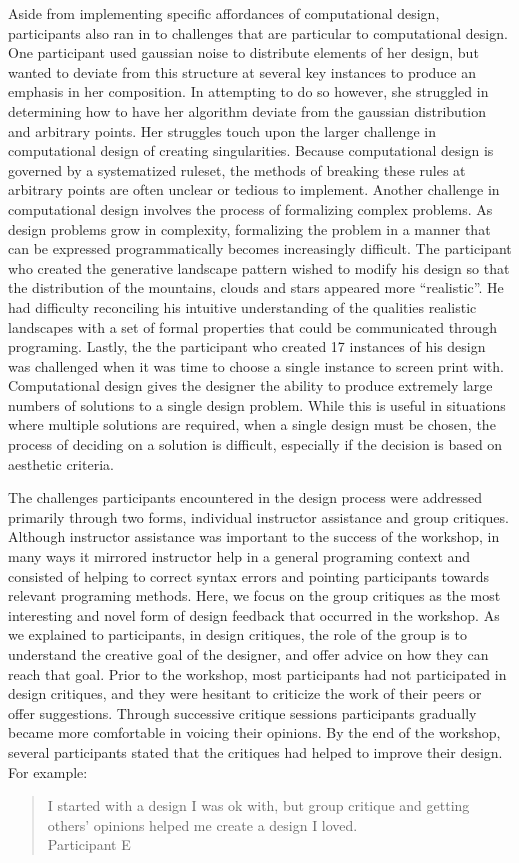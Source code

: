 \documentclass{sigchi}
\begin{document}
Aside from implementing specific affordances of computational design, participants also ran in to challenges that are particular to computational design. 
One participant used gaussian noise to distribute elements of her design, but wanted to deviate from this structure at several key instances to produce an emphasis in her composition. In attempting to do so however, she struggled in determining how to have her algorithm deviate from the gaussian distribution and arbitrary points. Her struggles touch upon the larger challenge in computational design of creating singularities. Because computational design is governed by a systematized ruleset, the methods of breaking these rules at arbitrary points are often unclear or tedious to implement. Another challenge in computational design involves the process of formalizing complex problems. As design problems grow in complexity, formalizing the problem in a manner that can be expressed programmatically becomes increasingly difficult. The participant who created the generative landscape pattern wished to modify his design so that the distribution of the mountains, clouds and stars appeared more ``realistic''. He had difficulty reconciling his intuitive understanding of the qualities realistic landscapes with a set of formal properties that could be communicated through programing. Lastly, the the participant who created 17 instances of his design was challenged when it was time to choose a single instance to screen print with. Computational design gives the designer the ability to produce extremely large numbers of solutions to a single design problem. While this is useful in situations where multiple solutions are required, when a single design must be chosen, the process of deciding on a solution is difficult, especially if the decision is based on aesthetic criteria.

The challenges participants encountered in the design process were addressed primarily through two forms, individual instructor assistance and group critiques. Although instructor assistance was important to the success of the workshop, in many ways it mirrored instructor help in a general programing context and consisted of helping to correct syntax errors and pointing participants towards relevant programing methods. Here, we focus on the group critiques as the most interesting and novel form of design feedback that occurred in the workshop. As we explained to participants, in design critiques, the role of the group is to understand the creative goal of the designer, and offer advice on how they can reach that goal. Prior to the workshop, most participants had not participated in design critiques, and they were hesitant to criticize the work of their peers or offer suggestions. Through successive critique sessions participants gradually became more comfortable in voicing their opinions. By the end of the workshop, several participants stated that the critiques had helped to improve their design. For example:
\begin{quotation}
	I started with a design I was ok with, but group critique and getting others' opinions helped me create a design I loved.
	\\Participant E
\end{quotation}
\end{document}
